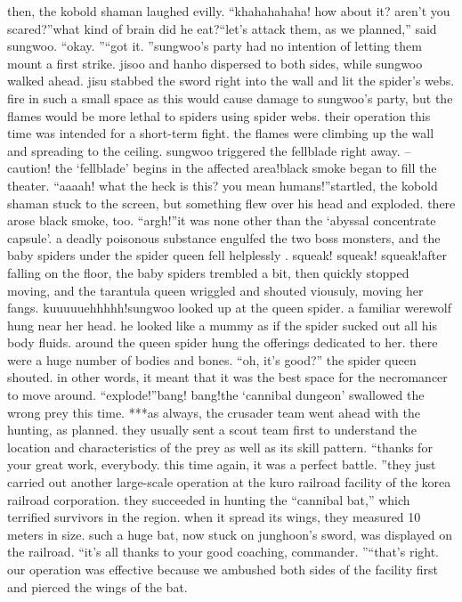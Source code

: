 then, the kobold shaman laughed evilly.
“khahahahaha! how about it? aren’t you scared?”what kind of brain did he eat?“let’s attack them, as we planned,” said sungwoo.
“okay.
”“got it.
”sungwoo’s party had no intention of letting them mount a first strike.
jisoo and hanho dispersed to both sides, while sungwoo walked ahead.
jisu stabbed the sword right into the wall and lit the spider’s webs.
fire in such a small space as this would cause damage to sungwoo’s party, but the flames would be more lethal to spiders using spider webs.
their operation this time was intended for a short-term fight.
the flames were climbing up the wall and spreading to the ceiling.
sungwoo triggered the fellblade right away.
– caution! the ‘fellblade’ begins in the affected area!black smoke began to fill the theater.
“aaaah! what the heck is this? you mean humans!”startled, the kobold shaman stuck to the screen, but something flew over his head and exploded.
 there arose black smoke, too.
“argh!”it was none other than the ‘abyssal concentrate capsule’.
 a deadly poisonous substance engulfed the two boss monsters, and the baby spiders under the spider queen fell helplessly .
squeak! squeak! squeak!after falling on the floor, the baby spiders trembled a bit, then quickly stopped moving, and the tarantula queen wriggled and shouted viousuly, moving her fangs.
kuuuuuehhhhh!sungwoo looked up at the queen spider.
 a familiar werewolf hung near her head.
 he looked like a mummy as if the spider sucked out all his body fluids.
around the queen spider hung the offerings dedicated to her.
 there were a huge number of bodies and bones.
“oh, it’s good?” the spider queen shouted.
in other words, it meant that it was the best space for the necromancer to move around.
“explode!”bang! bang!the ‘cannibal dungeon’ swallowed the wrong prey this time.
***as always, the crusader team went ahead with the hunting, as planned.
 they usually sent a scout team first to understand the location and characteristics of the prey as well as its skill pattern.
“thanks for your great work, everybody.
 this time again, it was a perfect battle.
”they just carried out another large-scale operation at the kuro railroad facility of the korea railroad corporation.
 they succeeded in hunting the “cannibal bat,” which terrified survivors in the region.
 when it spread its wings, they measured 10 meters in size.
 such a huge bat, now stuck on junghoon’s sword, was displayed on the railroad.
“it’s all thanks to your good coaching, commander.
”“that’s right.
 our operation was effective because we ambushed both sides of the facility first and pierced the wings of the bat.

